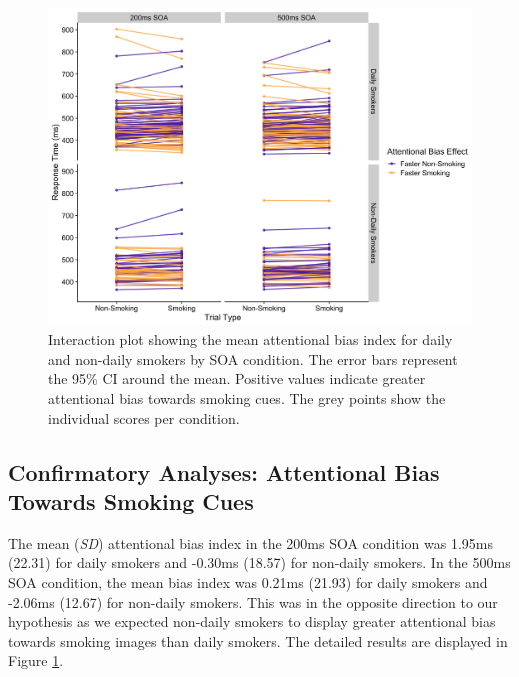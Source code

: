 \documentclass[empirical, authordate]{jote-new-article}
\begin{document}
\begin{figure}

  \begin{fullwidth}
    \includegraphics[width=\linewidth]{media/image3.jpeg}
    \caption{Interaction plot showing the mean attentional bias index for daily and non-daily smokers by SOA condition. The error bars represent the 95\% CI around the mean. Positive values indicate greater attentional bias towards smoking cues. The grey points show the individual scores per condition.}
    \label{fig:3}

  \end{fullwidth}


\end{figure}
\subsection{Confirmatory Analyses: Attentional Bias Towards Smoking Cues}

The mean (\emph{SD}) attentional bias index in the 200ms SOA condition was 1.95ms (22.31) for daily smokers and -0.30ms (18.57) for non-daily smokers. In the 500ms SOA condition, the mean bias index was 0.21ms (21.93) for daily smokers and -2.06ms (12.67) for non-daily smokers. This was in the opposite direction to our hypothesis as we expected non-daily smokers to display greater attentional bias towards smoking images than daily smokers. The detailed results are displayed in Figure \ref{fig:3}.
\end{document}
